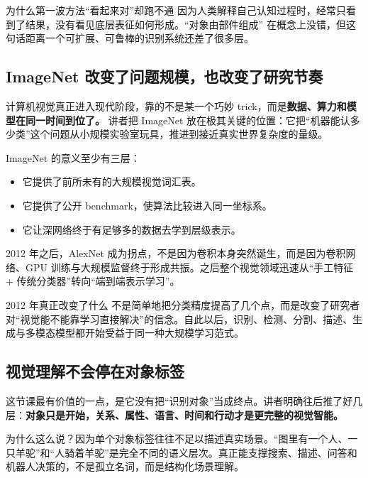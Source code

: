 \documentclass[a4paper]{article}
\begin{document}
\begin{warningbox}{为什么第一波方法``看起来对''却跑不通}
因为人类解释自己认知过程时，经常只看到了结果，没有看见底层表征如何形成。``对象由部件组成'' 在概念上没错，但这句话距离一个可扩展、可鲁棒的识别系统还差了很多层。
\end{warningbox}

\subsection{ImageNet 改变了问题规模，也改变了研究节奏}

计算机视觉真正进入现代阶段，靠的不是某一个巧妙 trick，而是\textbf{数据、算力和模型在同一时间到位了。} 讲者把 ImageNet 放在极其关键的位置：它把``机器能认多少类''这个问题从小规模实验室玩具，推进到接近真实世界复杂度的量级。

ImageNet 的意义至少有三层：

\begin{itemize}
    \item 它提供了前所未有的大规模视觉词汇表。
    \item 它提供了公开 benchmark，使算法比较进入同一坐标系。
    \item 它让深网络终于有足够多的数据去学到层级表示。
\end{itemize}

2012 年之后，AlexNet 成为拐点，不是因为卷积本身突然诞生，而是因为卷积网络、GPU 训练与大规模监督终于形成共振。之后整个视觉领域迅速从``手工特征 + 传统分类器''转向``端到端表示学习''。

\begin{importantbox}{2012 年真正改变了什么}
不是简单地把分类精度提高了几个点，而是改变了研究者对``视觉能不能靠学习直接解决''的信念。自此以后，识别、检测、分割、描述、生成与多模态模型都开始受益于同一种大规模学习范式。
\end{importantbox}

\subsection{视觉理解不会停在对象标签}

这节课最有价值的一点，是它没有把``识别对象''当成终点。讲者明确往后推了好几层：\textbf{对象只是开始，关系、属性、语言、时间和行动才是更完整的视觉智能。}

为什么这么说？因为单个对象标签往往不足以描述真实场景。``图里有一个人、一只羊驼''和``人骑着羊驼''是完全不同的语义层次。真正能支撑搜索、描述、问答和机器人决策的，不是孤立名词，而是结构化场景理解。
\end{document}
